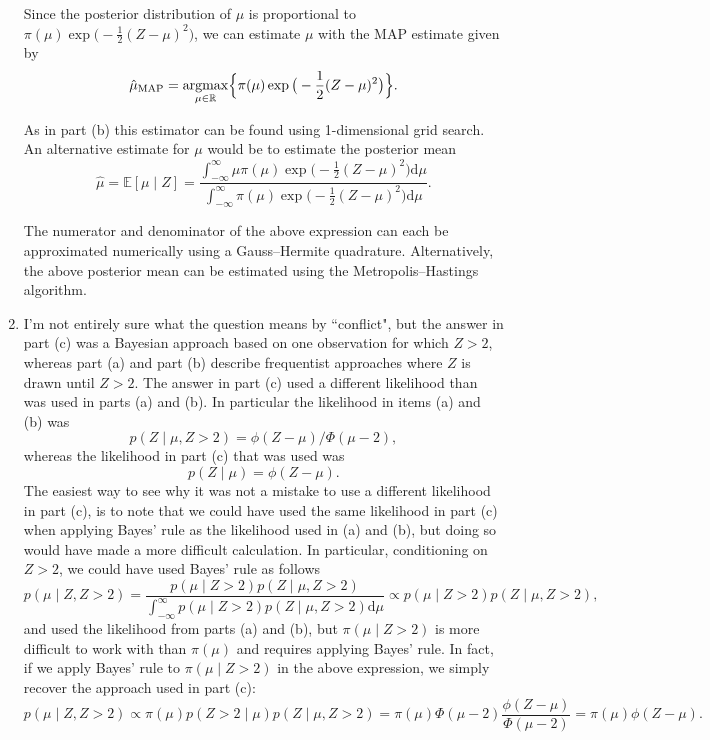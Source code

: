 \begin{enumerate}[label=(\alph*)]
Since the posterior distribution of $\mu$ is proportional to $\pi(\mu)  \exp \big( -\frac{1}{2} (Z-\mu)^2 \big)$, we can estimate $\mu$ with the MAP estimate given by $$\hat{\mu}_{\text{MAP}} =\operatorname*{argmax}_{\mu \in \mathbb{R}}  \Bigl\{ \pi(\mu)  \exp \big( -\frac{1}{2} (Z-\mu)^2 \big) \Bigr\}.$$

As in part (b) this estimator can be found using 1-dimensional grid search. An alternative estimate for $\mu$ would be to estimate the posterior mean $$\hat{\mu} =\mathbb{E}[ \mu \mid Z]= \frac{\int_{-\infty}^{\infty} \mu \pi(\mu)  \exp \big( -\frac{1}{2} (Z-\mu)^2 \big) \text{d} \mu}{ \int_{-\infty}^{\infty} \pi(\mu)  \exp \big( -\frac{1}{2} (Z-\mu)^2 \big) \text{d} \mu}.$$

The numerator and denominator of the above expression can each be approximated numerically using a Gauss--Hermite quadrature. Alternatively, the above posterior mean can be estimated using the Metropolis--Hastings algorithm.



\item I'm not entirely sure what the question means by ``conflict", but the answer in part (c) was a Bayesian approach based on one observation for which $Z>2$, whereas part (a) and part (b) describe frequentist approaches where $Z$ is drawn until $Z>2$. The answer in part (c) used a different likelihood than was used in parts (a) and (b). In particular the likelihood in items (a) and (b) was 
\[p(Z \mid \mu,Z>2)=\phi(Z-\mu)/\Phi(\mu -2),\] 
whereas the likelihood in part (c) that was used was 
\[p(Z \mid \mu)=\phi(Z-\mu).\] 
The easiest way to see why it was not a mistake to use a different likelihood in part (c), is to note that we could have used the same likelihood in part (c) when applying Bayes' rule as the likelihood used in (a) and (b), but doing so would have made a more difficult calculation. In particular, conditioning on $Z>2$, we could have used Bayes' rule as follows $$p( \mu \mid Z , Z> 2 ) = \frac{ p(\mu \mid Z>2) p(Z \mid \mu ,Z>2) }{\int_{-\infty}^{\infty} p(\mu \mid Z>2) p(Z \mid \mu , Z>2) \text{d} \mu } \propto p(\mu \mid Z>2) p(Z \mid \mu,Z>2),$$ and used the likelihood from parts (a) and (b), but $\pi(\mu \mid Z>2)$ is more difficult to work with than $\pi(\mu)$ and requires applying Bayes' rule. In fact, if we apply Bayes' rule to $\pi(\mu \mid Z>2)$ in the above expression, we simply recover the approach used in part (c): $$p( \mu \mid Z , Z> 2 ) \propto  \pi(\mu) p(Z >2 \mid \mu) p(Z \mid \mu, Z>2)=\pi(\mu)  \Phi(\mu-2) \frac{\phi(Z-\mu)}{\Phi(\mu -2)}=\pi(\mu) \phi(Z-\mu).$$

\end{enumerate}


